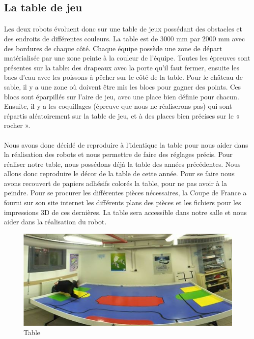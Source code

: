 \documentclass[12pt,a4paper]{article}
\begin{document}
\subsection{La table de jeu}

\paragraph{}
Les deux robots évoluent donc sur une table de jeux possédant des obstacles et des endroits de différentes couleurs. La 
table est de 3000 mm par 2000 mm avec des bordures de chaque côté. Chaque équipe possède une zone de départ matérialisée 
par une zone peinte à la couleur de l'équipe. Toutes les épreuves sont présentes sur la table:  
des drapeaux avec la porte qu'il faut fermer, ensuite les bacs d'eau avec les poissons à pêcher sur le côté de la table. 
Pour le château de sable, il y a une zone où doivent être mis les blocs pour gagner des points. Ces blocs sont éparpillés 
sur l'aire de jeu, avec une place bien définie pour chacun. Ensuite, il y a les coquillages (épreuve que nous 
ne réaliserons pas) qui sont répartis aléatoirement sur la table de jeu, et à des places bien précises sur 
le « rocher ».

\paragraph{}
Nous avons donc décidé de reproduire à l'identique la table pour nous aider dans la réalisation des robots et 
nous permettre de faire des réglages précis.
Pour réaliser notre table, nous possédons déjà la table des années précédentes. Nous allons donc reproduire le 
décor de la table de cette année. Pour se faire nous avons recouvert de papiers adhésifs colorés la table, pour 
ne pas avoir à la peindre. Pour se procurer les différentes pièces nécessaires, la Coupe de France a fourni 
sur son site internet les différents plans des pièces et les fichiers pour les impressions 3D de ces dernières. 
La table sera accessible dans notre salle et nous aider dans la réalisation du robot.


\begin{figure}[!h]
\centering
\includegraphics[width=12 cm]{img/table.jpg}
\caption{Table}
\end{figure}
\end{document}
